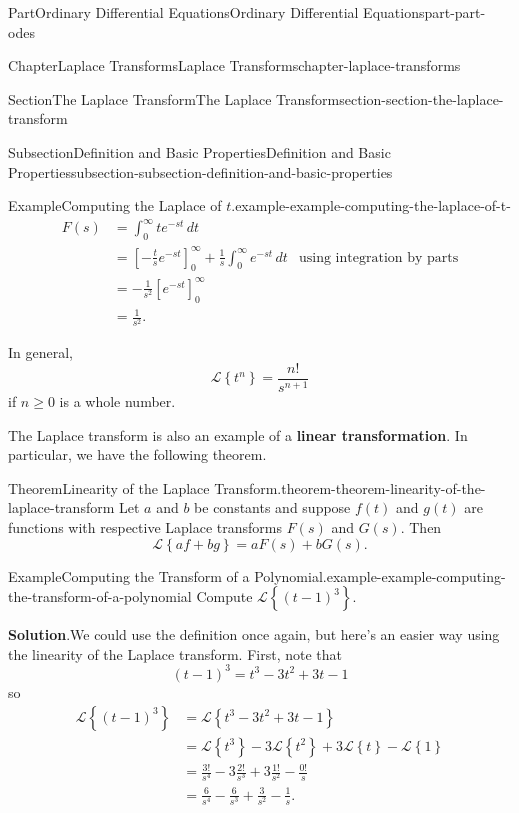 \documentclass[twoside,10pt,]{book}
\newcommand{\blocktitlefont}{\relax}
\newcommand{\terminology}[1]{\textbf{#1}}
\numberwithin{equation}{part}
\newcommand{\Laplace}[1]{\mathcal{L}\set{#1}}
\newcommand{\set}[1]{\left\{ #1 \right\}}
\begin{document}
\begin{partptx}{Part}{Ordinary Differential Equations}{}{Ordinary Differential Equations}{}{}{part-part-odes}
\begin{chapterptx}{Chapter}{Laplace Transforms}{}{Laplace Transforms}{}{}{chapter-laplace-transforms}
\begin{sectionptx}{Section}{The Laplace Transform}{}{The Laplace Transform}{}{}{section-section-the-laplace-transform}
\begin{subsectionptx}{Subsection}{Definition and Basic Properties}{}{Definition and Basic Properties}{}{}{subsection-subsection-definition-and-basic-properties}
\begin{example}{Example}{Computing the Laplace of \(t\).}{example-example-computing-the-laplace-of-t-}
\begin{align*}
F(s) &= \int_{0}^{\infty}te^{-st}\,dt\\
&= \left[-\frac{t}{s}e^{-st}\right]_{0}^{\infty} + \frac{1}{s}\int_{0}^{\infty}e^{-st}\,dt &\text{using integration by parts}\\
&= -\frac{1}{s^{2}}\left[e^{-st}\right]_{0}^{\infty}\\
&= \frac{1}{s^{2}}\text{.}
\end{align*}
%
\end{example}
In general,%
\begin{equation*}
\mathcal{L}\left\{t^{n}\right\} = \frac{n!}{s^{n+1}}
\end{equation*}
if \(n\geq0\) is a whole number.%
\par
The Laplace transform is also an example of a \terminology{linear transformation}. In particular, we have the following theorem.%
\begin{theorem}{Theorem}{Linearity of the Laplace Transform.}{}{theorem-theorem-linearity-of-the-laplace-transform}%
Let \(a\) and \(b\) be constants and suppose \(f(t)\) and \(g(t)\) are functions with respective Laplace transforms \(F(s)\) and \(G(s)\). Then%
\begin{equation*}
\Laplace{af+bg} = aF(s)+bG(s).
\end{equation*}
%
\end{theorem}
\begin{example}{Example}{Computing the Transform of a Polynomial.}{example-example-computing-the-transform-of-a-polynomial}%
Compute \(\Laplace{(t-1)^{3}}\).%
\par\smallskip%
\noindent\textbf{\blocktitlefont Solution}.\hypertarget{solution-example-computing-the-transform-of-a-polynomial-c}{}\quad{}We could use the definition once again, but here's an easier way using the linearity of the Laplace transform. First, note that%
\begin{equation*}
(t-1)^{3} = t^{3} - 3t^{2} +3t - 1
\end{equation*}
so%
\begin{align*}
\Laplace{(t-1)^{3}} &= \Laplace{t^{3}-3t^{2}+3t-1}\\
&= \Laplace{t^{3}} - 3\Laplace{t^{2}} +3\Laplace{t} - \Laplace{1}\\
&= \frac{3!}{s^{4}} - 3\frac{2!}{s^{3}} + 3\frac{1!}{s^{2}} - \frac{0!}{s}\\
&= \frac{6}{s^{4}} - \frac{6}{s^{3}} + \frac{3}{s^{2}} - \frac{1}{s}\text{.}
\end{align*}
%
\end{example}

\end{subsectionptx}
\end{sectionptx}
\end{chapterptx}
\end{partptx}
\end{document}
